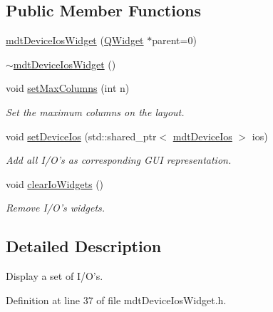 \subsection*{Public Member Functions}
\begin{DoxyCompactItemize}
\item 
\hyperlink{classmdt_device_ios_widget_affd43c16896f0191038911231b52a1fd}{mdt\-Device\-Ios\-Widget} (\hyperlink{class_q_widget}{Q\-Widget} $\ast$parent=0)
\item 
\hyperlink{classmdt_device_ios_widget_a7071f70c3aba15dbfe0eabec5093a4d5}{$\sim$mdt\-Device\-Ios\-Widget} ()
\item 
void \hyperlink{classmdt_device_ios_widget_ad388c95b2bdb48bae976c3fbc2512c30}{set\-Max\-Columns} (int n)
\begin{DoxyCompactList}\small\item\em Set the maximum columns on the layout. \end{DoxyCompactList}\item 
void \hyperlink{classmdt_device_ios_widget_ae3fb7261ae27b0b2c9f2d96d16a818bd}{set\-Device\-Ios} (std\-::shared\-\_\-ptr$<$ \hyperlink{classmdt_device_ios}{mdt\-Device\-Ios} $>$ ios)
\begin{DoxyCompactList}\small\item\em Add all I/\-O's as corresponding G\-U\-I representation. \end{DoxyCompactList}\item 
void \hyperlink{classmdt_device_ios_widget_af5183009a724c9e8f17cb428fc98b85f}{clear\-Io\-Widgets} ()
\begin{DoxyCompactList}\small\item\em Remove I/\-O's widgets. \end{DoxyCompactList}\end{DoxyCompactItemize}


\subsection{Detailed Description}
Display a set of I/\-O's. 

Definition at line 37 of file mdt\-Device\-Ios\-Widget.\-h.




